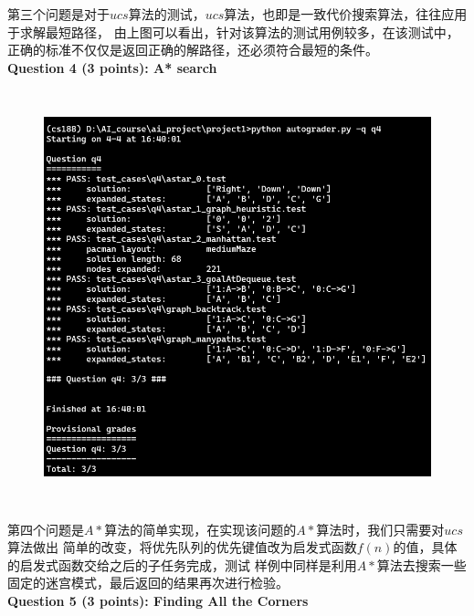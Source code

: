 \documentclass[a4paper,12pt,UTF8]{article}
\begin{document}
\begin{flushleft}
{\begin{figure}[h]
    \end{figure}
    \normalsize{
        \hspace{1cm}第三个问题是对于$ucs$算法的测试，$ucs$算法，也即是一致代价搜索算法，往往应用于求解最短路径，
        由上图可以看出，针对该算法的测试用例较多，在该测试中，正确的标准不仅仅是返回正确的解路径，还必须符合最短的条件。\\
    }
    \newpage
    \large{
        \hspace{1cm}\textbf{
            Question 4 (3 points): A* search\\
        }
    }
    \begin{figure}[h]
        \centering
        \includegraphics[width=12cm,height=12cm]{4.png}
    \end{figure}
    \normalsize{
        \hspace{1cm}第四个问题是$A*$算法的简单实现，在实现该问题的$A*$算法时，我们只需要对$ucs$算法做出
        简单的改变，将优先队列的优先键值改为启发式函数$f(n)$的值，具体的启发式函数交给之后的子任务完成，测试
        样例中同样是利用$A*$算法去搜索一些固定的迷宫模式，最后返回的结果再次进行检验。\\
    }
    \newpage
    \large{
        \hspace{1cm}\textbf{
            Question 5 (3 points): Finding All the Corners\\
        }
    }
    \begin{figure}[h]
        \centering

\end{figure}}
\end{flushleft}
\end{document}
